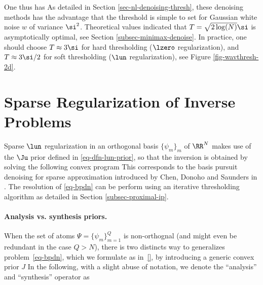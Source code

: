 One thus has
As detailed in Section \ref{sec-nl-denoising-thresh}, these denoising methods has the advantage that the threshold is simple to set for Gaussian white noise $w$ of variance $\si^2$. Theoretical values indicated that $T = \sqrt{2\log(N)} \si$ is asymptotically optimal, see Section \ref{subsec-minimax-denoise}. In practice, one should choose $T \approx 3\si$ for hard thresholding ($\lzero$ regularization), and $T \approx 3\si/2$ for soft thresholding ($\lun$ regularization), see Figure \ref{fig-wavthresh-2d}.





\section{Sparse Regularization of Inverse Problems}
\label{sec-sparse-ip}

Sparse $\lun$ regularization in an orthogonal basis $\{\psi_m\}_m$ of $\RR^N$ makes use of the $\Ju$ prior defined in \eqref{eq-dfn-lun-prior}, so that the inversion is obtained by solving the following convex program
This corresponds to the basis pursuit denoising for sparse approximation introduced by Chen, Donoho and Saunders in \cite{chen-basis-pursuit}. The resolution of \eqref{eq-bpdn} can be perform using an iterative thresholding algorithm as detailed in Section \ref{subsec-proximal-ip}. 

\paragraph{Analysis vs. synthesis priors.}

When the set of atoms $\Psi = \{\psi_m\}_{m=1}^Q$ is non-orthognal (and might even be redundant in the case $Q>N$), there is two distincts way to generalizes problem~\eqref{eq-bpdn}, which we formulate as in~\eqref{}, by introducing a generic convex prior $J$
In the following, with a slight abuse of notation, we denote the ``analysis'' and ``synthesis'' operator as

